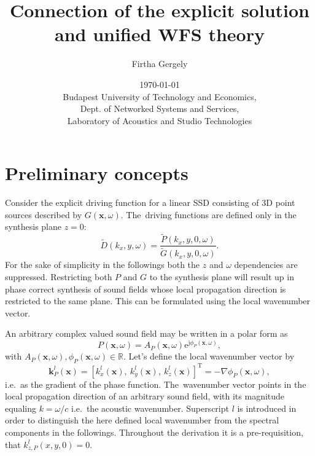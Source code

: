 \documentclass[12pt,a4paper]{article}
\title{Connection of the explicit solution and unified WFS theory}
\date{\today \\
Budapest University of Technology and Economics, \\ Dept. of Networked Systems and Services, \\ Laboratory of Acoustics and Studio Technologies}
\author{Firtha Gergely}
\newcommand{\te}{\mathrm{e}}
\newcommand{\ti}{\mathrm{j}}
\newcommand{\vx}{\mathbf{x}}
\newcommand{\vk}{\mathbf{k}}
\begin{document}
\maketitle

\section{Preliminary concepts}
Consider the explicit driving function for a linear SSD consisting of 3D point sources described by $G(\vx,\omega)$.
The~driving functions are defined only in the synthesis plane $z=0$:
\begin{equation}
\tilde{D}(k_x,y,\omega) = \frac{\tilde{P}(k_x,y,0,\omega)}{\tilde{G}(k_x,y,0,\omega)}. 
\end{equation}
For the sake of simplicity in the followings both the $z$ and $\omega$ dependencies are suppressed.
Restricting both $P$ and $G$ to the synthesis plane will result up in phase correct synthesis of sound fields whose local propagation direction is restricted to the same plane.
This can be formulated using the local wavenumber vector.

An arbitrary complex valued sound field may be written in a polar form as
\begin{equation}
P(\vx,\omega) = A_P(\vx,\omega) \te^{\ti \phi_P (\vx,\omega)},
\end{equation}
with $A_P(\vx,\omega), \phi_P(\vx,\omega) \in \mathbb{R} $.
Let's define the local wavenumber vector by
\begin{equation}
\vk^l_P(\vx) = [k_x^l(\vx),\ k_y^l(\vx),\ k_z^l(\vx)]^{\mathrm{T}} = -\nabla \phi_P(\vx,\omega),
\end{equation}
i.e.\ as the gradient of the phase function.
The~wavenumber vector points in the local propagation direction of an arbitrary sound field, with its magnitude equaling $k = \omega/c$ i.e.\ the acoustic wavenumber.
Superscript $l$ is introduced in order to distinguish the here defined local wavenumber from the spectral components in the followings.
Throughout the derivation it is a pre-requisition, that $k_{z,P}^l(x,y,0) = 0$. 
\end{document}
